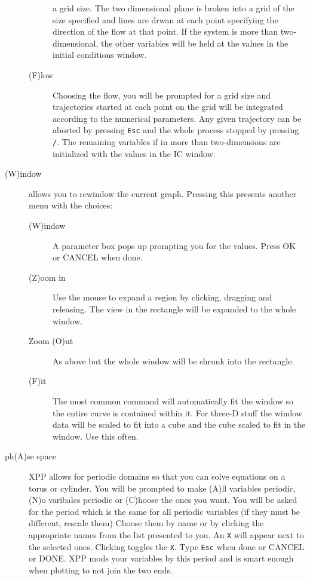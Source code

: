 \begin{description}
\begin{description}
a grid size.  The two dimensional plane is broken into a grid of the size
 specified and lines are drwan at each point specifying the direction of 
the flow at that point.  If the system is more than two-dimensional, the
 other variables will be held at the values in the initial conditions
window.
\item[(F)low] Choosing the flow, you will be prompted for a grid size
and
 trajectories
 started at each point on the grid will be integrated according to the
 numerical parameters.  Any given trajectory can be aborted by pressing 
{\tt Esc} and the whole process stopped by pressing {\tt /}.  The
remaining
 variables 
if in more than two-dimensions are initialized with the values in the IC window.
\end{description}


\item[(W)indow] allows you to rewindow the current graph.  Pressing this presents 
another menu with the choices:
\begin{description}
	\item[(W)indow]  A parameter box pops up prompting you for the values.  
Press OK or CANCEL when done.
	\item[(Z)oom in]  Use the mouse to expand a region by clicking, dragging and 
releasing.  The view in the rectangle will be expanded to the whole window.
	\item[Zoom (O)ut]  As above but the whole window will be shrunk into the 
rectangle.
	\item[(F)it]  The most common command will automatically fit the window so 
the entire curve is contained within it.  For three-D stuff the window data 
will be scaled to fit into a cube and the cube scaled to fit in the window. 
Use this often.
\end{description}
\item[ph(A)se space]  XPP allows for periodic domains so that you can solve 
equations on a torus or cylinder.  You will be prompted to make (A)ll variables
periodic, (N)o varibales periodic or (C)hoose the ones you want.  You will 
be asked for the period which is the same for all periodic variables (if they 
must be different, rescale them) Choose them by name or by clicking the 
appropriate names from the list presented to you. An {\tt X} will
appear next to the selected ones.  Clicking toggles the {\tt X}. 
 Type {\tt Esc} when done or CANCEL or DONE.
 XPP mods your variables by this period and is smart
 enough when plotting to not join the two ends. 


\end{description}
